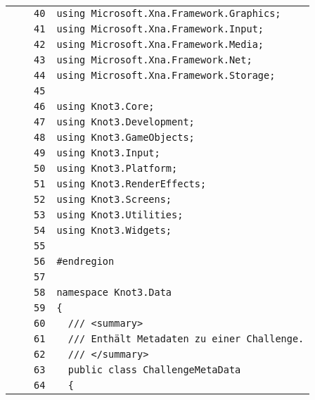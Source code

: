 \documentclass[a4paper,10pt]{article}
\begin{document}
\begin{longtable}[l]{lrrl}
\cellcolor{gray} &  & \verb~40~ & \verb~using Microsoft.Xna.Framework.Graphics;~\\
\cellcolor{gray} &  & \verb~41~ & \verb~using Microsoft.Xna.Framework.Input;~\\
\cellcolor{gray} &  & \verb~42~ & \verb~using Microsoft.Xna.Framework.Media;~\\
\cellcolor{gray} &  & \verb~43~ & \verb~using Microsoft.Xna.Framework.Net;~\\
\cellcolor{gray} &  & \verb~44~ & \verb~using Microsoft.Xna.Framework.Storage;~\\
\cellcolor{gray} &  & \verb~45~ & \verb~~\\
\cellcolor{gray} &  & \verb~46~ & \verb~using Knot3.Core;~\\
\cellcolor{gray} &  & \verb~47~ & \verb~using Knot3.Development;~\\
\cellcolor{gray} &  & \verb~48~ & \verb~using Knot3.GameObjects;~\\
\cellcolor{gray} &  & \verb~49~ & \verb~using Knot3.Input;~\\
\cellcolor{gray} &  & \verb~50~ & \verb~using Knot3.Platform;~\\
\cellcolor{gray} &  & \verb~51~ & \verb~using Knot3.RenderEffects;~\\
\cellcolor{gray} &  & \verb~52~ & \verb~using Knot3.Screens;~\\
\cellcolor{gray} &  & \verb~53~ & \verb~using Knot3.Utilities;~\\
\cellcolor{gray} &  & \verb~54~ & \verb~using Knot3.Widgets;~\\
\cellcolor{gray} &  & \verb~55~ & \verb~~\\
\cellcolor{gray} &  & \verb~56~ & \verb~#endregion~\\
\cellcolor{gray} &  & \verb~57~ & \verb~~\\
\cellcolor{gray} &  & \verb~58~ & \verb~namespace Knot3.Data~\\
\cellcolor{gray} &  & \verb~59~ & \verb~{~\\
\cellcolor{gray} &  & \verb~60~ & \verb~  /// <summary>~\\
\cellcolor{gray} &  & \verb~61~ & \verb~  /// Enthält Metadaten zu einer Challenge.~\\
\cellcolor{gray} &  & \verb~62~ & \verb~  /// </summary>~\\
\cellcolor{gray} &  & \verb~63~ & \verb~  public class ChallengeMetaData~\\
\cellcolor{gray} &  & \verb~64~ & \verb~  {~\\

\end{longtable}
\end{document}
